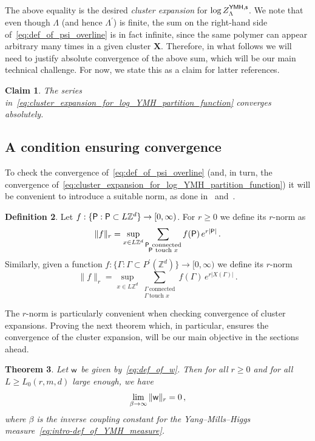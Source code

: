 \documentclass[11pt]{article}
\newtheorem{theorem}{Theorem}
\newtheorem{claim}[theorem]{Claim}
\theoremstyle{definition}
\newtheorem{definition}[theorem]{Definition}
\theoremstyle{remark}
\numberwithin{theorem}{section}
\def\La{{\Lambda}}
\def\Ga{{\Gamma}}
\newcommand{\bZ}{\mathbb Z}
\begin{document}
    The above equality is the desired \emph{cluster expansion} for $\log Z_{\Lambda}^{{\sf YMH,s}}$. We note that even though $\La$ (and hence $\La^\prime$) is finite, the sum on the right-hand side of~\eqref{eq:def_of_psi_overline} is in fact infinite, since the same polymer can appear arbitrary many times in a given cluster $\mathbf{X}$. Therefore, in what follows we will need to justify absolute convergence of the above sum, which will be our main technical challenge. For now, we state this as a claim for latter references.
    \begin{claim}
        \label{claim:cluster_expansion_converge}
        The series in~\eqref{eq:cluster_expansion_for_log_YMH_partition_function} converges absolutely.
    \end{claim}
    \subsection{A condition ensuring convergence}
    To check the convergence of~\eqref{eq:def_of_psi_overline} (and, in turn, the convergence of~\eqref{eq:cluster_expansion_for_log_YMH_partition_function}) it will be convenient to introduce a suitable norm, as done in~\cite[Section~9]{Balaban-Imbrie-Jaffe-Brydges} and~\cite[Chapter~V]{Simon-book}.
    \begin{definition}
        \label{def:r_norm}
        Let $f:\{{\sf P} : {\sf P}\subset L\bZ^d \} \to [0,\infty)$. For $r\ge 0$ we define its $r$-norm as 
        \[
        \|f \|_r = \sup_{x\in L\bZ^d} \sum_{\substack{{\sf P} \ \text{connected} \\ {\sf P} \  \text{touch } x }} f({\sf P}) \,  e^{r|{\sf P}|} \, .
        \]
        Similarly, given a function $f:\{ \Ga: \Ga\subset P^\prime(\bZ^d)\} \to [0,\infty)$ we define its $r$-norm
        \[
        \|f\|_r = \sup_{x\in L\bZ^d} \sum_{\substack{\Ga\ \text{connected} \\ \Ga \  \text{touch } x }} f(\Ga) \,  e^{r|X(\Ga)|} \, .
        \]
    \end{definition}
    \noindent 
    The $r$-norm is particularly convenient when checking convergence of cluster expansions. Proving the next theorem  which, in particular, ensures the convergence of the cluster expansion, will be our main objective in the sections ahead. 
    \begin{theorem}
        \label{theorem:condition_ensuring_convergence}
        Let ${\sf w}$ be given by~\eqref{eq:def_of_w}. Then for all $r\ge 0$ and for all $L\ge L_0(r,m,d)$ large enough, we have
        \[
        \lim_{\beta\to\infty} \| {\sf w} \|_r = 0 \, ,
        \]
        where $\beta$ is the inverse coupling constant for the Yang--Mills--Higgs measure~\eqref{eq:intro-def_of_YMH_measure}. 
    \end{theorem}
\end{document}
